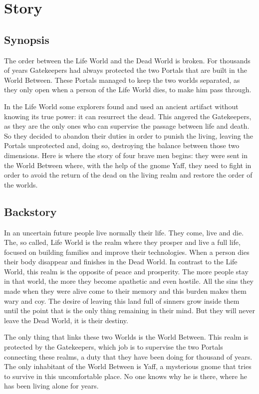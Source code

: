 \documentclass[12pt]{article}
\begin{document}
\newpage

\section{Story}

\subsection{Synopsis}

The order between the Life World and the Dead World is broken. For thousands of years Gatekeepers had always protected the two Portals that are built in the World Between. These Portals managed to keep the two worlds separated, as they only open when a person of the Life World dies, to make him pass through.

In the Life World some explorers found and used an ancient artifact without knowing its true power: it can resurrect the dead. This angered the Gatekeepers, as they are the only ones who can supervise the passage between life and death. So they decided to abandon their duties in order to punish the living, leaving the Portals unprotected and, doing so, destroying the balance between those two dimensions. Here is where the story of four brave men begins: they were sent in the World Between where, with the help of the gnome Yaff, they need to fight in order to avoid the return of the dead on the living realm and restore the order of the worlds. 

\subsection{Backstory}

In an uncertain future people live normally their life. They come, live and die. The, so called, Life World is the realm where they prosper and live a full life, focused on building families and improve their technologies. When a person dies their body disappear and finishes in the Dead World. In contrast to the Life World, this realm is the opposite of peace and prosperity. The more people stay in that world, the more they become apathetic and even hostile. All the sins they made when they were alive come to their memory and this burden makes them wary and coy. The desire of leaving this land full of sinners grow inside them until the point that is the only thing remaining in their mind. But they will never leave the Dead World, it is their destiny.

The only thing that links these two Worlds is the World Between. This realm is protected by the Gatekeepers, which job is to supervise the two Portals connecting these realms, a duty that they have been doing for thousand of years. 
The only inhabitant of the World Between is Yaff, a mysterious gnome that tries to survive in this uncomfortable place. No one knows why he is there, where he has been living alone for years.
\end{document}
